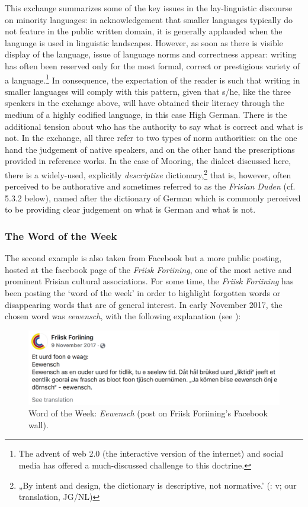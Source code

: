 \documentclass[output=paper]{langsci/langscibook}
\begin{document}
This exchange summarizes some of the key issues in the lay-linguistic discourse on minority languages: in acknowledgement that smaller languages typically do not feature in the public written domain, it is generally applauded when the language is used in linguistic landscapes. However, as soon as there is visible display of the language, issue of language norms and correctness appear: writing has often been reserved only for the most formal, correct or prestigious variety of a language.\footnote{The advent of web 2.0 (the interactive version of the internet) and social media has offered a much-discussed challenge to this doctrine.} In consequence, the expectation of the reader is such that writing in smaller languages will comply with this pattern, given that s/he, like the three speakers in the exchange above, will have obtained their literacy through the medium of a highly codified language, in this case High German. There is the additional tension about who has the authority to say what is correct and what is not. In the exchange, all three refer to two types of norm authorities: on the one hand the judgement of native speakers, and on the other hand the prescriptions provided in reference works. In the case of Mooring, the dialect discussed here, there is a widely-used, explicitly \textit{descriptive} dictionary,\footnote{„By intent and design, the dictionary is descriptive, not normative.’ (\citealt{SjolinEtAl1988}: v; our translation, JG/NL)} that is, however, often perceived to be authorative and sometimes referred to as the \textit{Frisian Duden} (cf. 5.3.2 below), named after the dictionary of German which is commonly perceived to be providing clear judgement on what is German and what is not. 


\subsubsection{The Word of the Week}
\label{sec:gregersen:5.3.2}

The second example is also taken from Facebook but a more public posting, hosted at the facebook page of the \textit{Friisk Foriining}, one of the most active and prominent Frisian cultural associations. For some time, the \textit{Friisk Foriining} has been posting the ‘word of the week’ in order to highlight forgotten words or disappearing words that are of general interest. In early November 2017, the chosen word was \textit{eewensch}, with the following explanation (see ):

 \begin{figure}
 \includegraphics[width=\textwidth]{figures/fig3_gregersen}
 \caption{Word of the Week: \textit{Eewensch} (post on Friisk Foriining’s Facebook wall).}\label{fig:gregersen:3}
 \end{figure}
\end{document}
